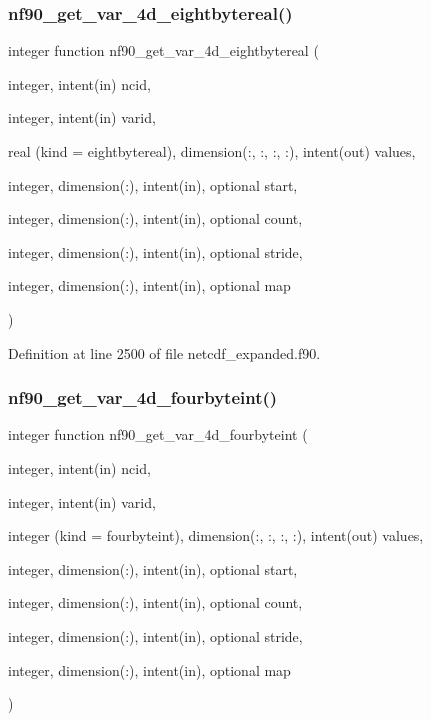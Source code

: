 \subsubsection{\texorpdfstring{nf90\+\_\+get\+\_\+var\+\_\+4d\+\_\+eightbytereal()}{nf90\_get\_var\_4d\_eightbytereal()}}
{\footnotesize\ttfamily integer function nf90\+\_\+get\+\_\+var\+\_\+4d\+\_\+eightbytereal (\begin{DoxyParamCaption}\item[{integer, intent(in)}]{ncid,  }\item[{integer, intent(in)}]{varid,  }\item[{real (kind = eightbytereal), dimension(\+:, \+:, \+:, \+:), intent(out)}]{values,  }\item[{integer, dimension(\+:), intent(in), optional}]{start,  }\item[{integer, dimension(\+:), intent(in), optional}]{count,  }\item[{integer, dimension(\+:), intent(in), optional}]{stride,  }\item[{integer, dimension(\+:), intent(in), optional}]{map }\end{DoxyParamCaption})}



Definition at line 2500 of file netcdf\+\_\+expanded.\+f90.

\mbox{\label{netcdf__expanded_8f90_a3a7fc4659ac040e3169e48186b0747f7}} 
\subsubsection{\texorpdfstring{nf90\+\_\+get\+\_\+var\+\_\+4d\+\_\+fourbyteint()}{nf90\_get\_var\_4d\_fourbyteint()}}
{\footnotesize\ttfamily integer function nf90\+\_\+get\+\_\+var\+\_\+4d\+\_\+fourbyteint (\begin{DoxyParamCaption}\item[{integer, intent(in)}]{ncid,  }\item[{integer, intent(in)}]{varid,  }\item[{integer (kind = fourbyteint), dimension(\+:, \+:, \+:, \+:), intent(out)}]{values,  }\item[{integer, dimension(\+:), intent(in), optional}]{start,  }\item[{integer, dimension(\+:), intent(in), optional}]{count,  }\item[{integer, dimension(\+:), intent(in), optional}]{stride,  }\item[{integer, dimension(\+:), intent(in), optional}]{map }\end{DoxyParamCaption})}




